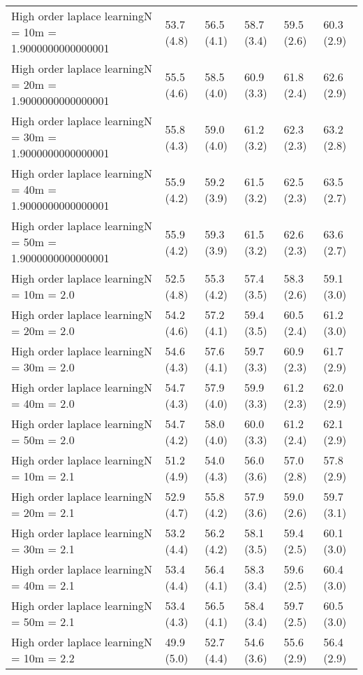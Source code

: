 \documentclass{article}
\begin{document}
\begin{table*}[t!]
\begin{center}
\begin{small}
\begin{sc}
\begin{tabular}{llllll}
High order laplace learningN = 10m = 1.9000000000000001&53.7 (4.8)      &56.5 (4.1)      &58.7 (3.4)      &59.5 (2.6)      &60.3 (2.9)      \\
High order laplace learningN = 20m = 1.9000000000000001&55.5 (4.6)      &58.5 (4.0)      &60.9 (3.3)      &61.8 (2.4)      &62.6 (2.9)      \\
High order laplace learningN = 30m = 1.9000000000000001&55.8 (4.3)      &59.0 (4.0)      &61.2 (3.2)      &62.3 (2.3)      &63.2 (2.8)      \\
High order laplace learningN = 40m = 1.9000000000000001&55.9 (4.2)      &59.2 (3.9)      &61.5 (3.2)      &62.5 (2.3)      &63.5 (2.7)      \\
High order laplace learningN = 50m = 1.9000000000000001&55.9 (4.2)      &59.3 (3.9)      &61.5 (3.2)      &62.6 (2.3)      &63.6 (2.7)      \\
High order laplace learningN = 10m = 2.0&52.5 (4.8)      &55.3 (4.2)      &57.4 (3.5)      &58.3 (2.6)      &59.1 (3.0)      \\
High order laplace learningN = 20m = 2.0&54.2 (4.6)      &57.2 (4.1)      &59.4 (3.5)      &60.5 (2.4)      &61.2 (3.0)      \\
High order laplace learningN = 30m = 2.0&54.6 (4.3)      &57.6 (4.1)      &59.7 (3.3)      &60.9 (2.3)      &61.7 (2.9)      \\
High order laplace learningN = 40m = 2.0&54.7 (4.3)      &57.9 (4.0)      &59.9 (3.3)      &61.2 (2.3)      &62.0 (2.9)      \\
High order laplace learningN = 50m = 2.0&54.7 (4.2)      &58.0 (4.0)      &60.0 (3.3)      &61.2 (2.4)      &62.1 (2.9)      \\
High order laplace learningN = 10m = 2.1&51.2 (4.9)      &54.0 (4.3)      &56.0 (3.6)      &57.0 (2.8)      &57.8 (2.9)      \\
High order laplace learningN = 20m = 2.1&52.9 (4.7)      &55.8 (4.2)      &57.9 (3.6)      &59.0 (2.6)      &59.7 (3.1)      \\
High order laplace learningN = 30m = 2.1&53.2 (4.4)      &56.2 (4.2)      &58.1 (3.5)      &59.4 (2.5)      &60.1 (3.0)      \\
High order laplace learningN = 40m = 2.1&53.4 (4.4)      &56.4 (4.1)      &58.3 (3.4)      &59.6 (2.5)      &60.4 (3.0)      \\
High order laplace learningN = 50m = 2.1&53.4 (4.3)      &56.5 (4.1)      &58.4 (3.4)      &59.7 (2.5)      &60.5 (3.0)      \\
High order laplace learningN = 10m = 2.2&49.9 (5.0)      &52.7 (4.4)      &54.6 (3.6)      &55.6 (2.9)      &56.4 (2.9)      \\

\end{tabular}
\end{sc}
\end{small}
\end{center}
\end{table*}
\end{document}
